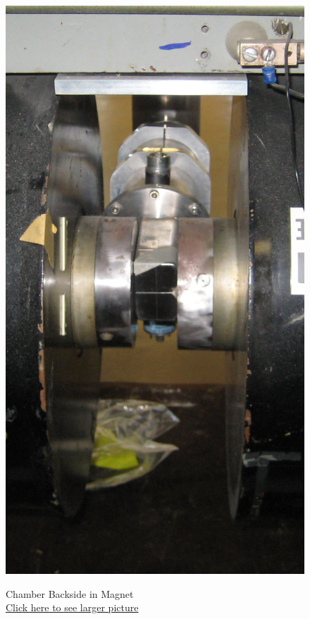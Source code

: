 \documentclass{../lab}
\begin{document}
\begin{figure}[!htb]
  \href{http://experimentationlab.berkeley.edu/sites/default/files/images/Magnet_Backside_Polepieces_Crop_3307.jpg}{\includegraphics[width=\linewidth,keepaspectratio]{images/Magnet_Backside_Polepieces_Crop_3307.jpg}}
  \caption{Chamber Backside in Magnet \\ \href{http://experimentationlab.berkeley.edu/sites/default/files/images/Magnet_Backside_Polepieces_Crop_3307.jpg}{Click here to see larger picture}}

\end{figure}
\end{document}
